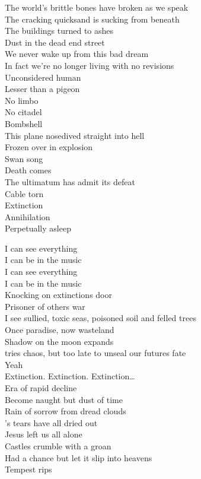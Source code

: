 The world's brittle bones have broken as we speak \\
The cracking quicksand is sucking from beneath \\
The buildings turned to ashes \\
Dust in the dead end street \\
We never wake up from this bad dream \\
In fact we're no longer living with no revisions \\
Unconsidered human \\
Lesser than a pigeon \\
No limbo \\
No citadel \\
Bombshell \\
This plane nosedived straight into hell \\
Frozen over in explosion \\

Swan song \\
Death comes \\
The ultimatum has admit its defeat \\
Cable torn \\
Extinction \\
Annihilation \\
Perpetually asleep \\



I can see everything \\
I can be in the music \\
I can see everything \\
I can be in the music \\

Knocking on extinctions door \\
Prisoner of others war \\
I see sullied, toxic seas, poisoned soil and felled trees \\
Once paradise, now wasteland \\
Shadow on the moon expands \\
 tries chaos, but too late to unseal our futures fate \\
Yeah \\

Extinction. Extinction. Extinction… \\

Era of rapid decline \\
Become naught but dust of time \\
Rain of sorrow from dread clouds \\
's tears have all dried out \\
Jesus left us all alone \\
Castles crumble with a groan \\
Had a chance but let it slip into heavens \\
Tempest rips \\

